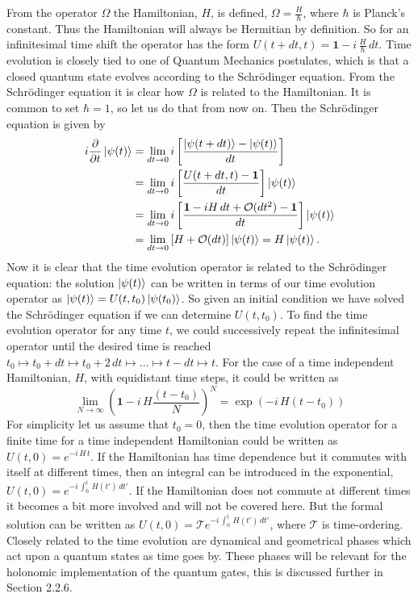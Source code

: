 From the operator $\Omega$ the Hamiltonian, $H$, is defined, $\Omega = \frac{H}{\hbar}$, where $\hbar$ is Planck's constant. Thus the Hamiltonian will always be Hermitian by definition. So for an infinitesimal time shift the operator has the form $U(t + dt, t) = \mathbf{1} - i\,\frac{H}{\hbar} \,dt$.
Time evolution is closely tied to one of Quantum Mechanics postulates, which is that a closed quantum state evolves according to the Schrödinger equation. From the Schrödinger equation it is clear how $\Omega$ is related to the Hamiltonian. It is common to set $\hbar = 1$, so let us do that from now on. Then the Schrödinger equation is given by 
\begin{equation} 
\begin{aligned}
i \pdv{}{t} \ket{\psi(t)} &= \lim_{dt \rightarrow 0} i\left[ \frac{\ket{\psi(t+dt)} - \ket{\psi(t)}}{dt} \right] \\&= \lim_{dt \rightarrow 0} i\left[ \frac{U(t+dt,t) - \mathbf{1}}{dt} \right]\ket{\psi(t)} \\&= \lim_{dt \rightarrow 0} i\left[ \frac{\mathbf{1} - iH\,dt + \mathcal{O}(dt^2) - \mathbf{1}}{dt} \right]\ket{\psi(t)} \\&= \lim_{dt \rightarrow 0} \left[H + \mathcal{O}(dt) \right]\ket{\psi(t)}  = H\ket{\psi(t)}.
\end{aligned}
\label{eq:schro}
\end{equation} 
Now it is clear that the time evolution operator is related to the Schrödinger equation:  the solution $\ket{\psi(t)}$ can be written in terms of our time evolution operator as
$\ket{\psi(t)} = U(t,t_0)\ket{\psi(t_0)}$. So given an initial condition we have solved the Schrödinger equation if we can determine $U(t,t_0)$.  
To find the time evolution operator for any time $t$, we could successively repeat the infinitesimal operator until the desired time is reached $t_0 \mapsto t_0 + dt \mapsto t_0 + 2\,dt \mapsto \dots \mapsto t - dt \mapsto t$. For the case of a time independent Hamiltonian, $H$, with equidistant time steps, it could be written as
\begin{equation}
\lim_{N \rightarrow \infty} \left(\mathbf{1} - i\,H\frac{(t-t_0)}{N} \right)^N = \exp\left(- i\,H(t-t_0) \right)
\end{equation}
For simplicity let us assume that $t_0 = 0$, then the time evolution operator for a finite time for a time independent Hamiltonian could be written as $U(t,0) = e^{-i\,H\,t}$. If the Hamiltonian has time dependence but it commutes with itself at different times, then an integral can be introduced in the exponential, $U(t,0) = e^{-i\,\int_0^t \,H(t')\, dt'}$. If the Hamiltonian does not commute at different times it becomes a bit more involved and will not be covered here. But the formal solution can be written as $U(t,0) = \mathcal{T}e^{-i\,\int_0^t \,H(t')\, dt'}$, where $\mathcal{T}$ is time-ordering. Closely related to the time evolution are dynamical and geometrical phases which act upon a quantum states as time goes by. These phases will be relevant for the holonomic implementation of the quantum gates, this is discussed further in Section 2.2.6.


